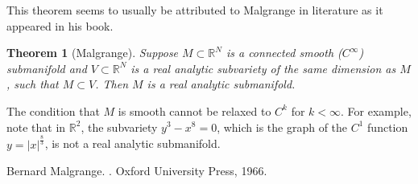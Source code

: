 \documentclass[12pt]{article}
\theoremstyle{theorem}
\newtheorem*{thm}{Theorem}
\theoremstyle{definition}
\theoremstyle{remark}
\begin{document}
This theorem seems to usually be attributed to Malgrange in literature as it appeared in his book\cite{Malgrange}.

\begin{thm}[Malgrange]
Suppose $M \subset {\mathbb{R}}^N$ is a connected smooth ($C^\infty$) submanifold and
$V \subset {\mathbb{R}}^N$ is a real analytic
subvariety of the same dimension as $M$, such that $M \subset V$.  Then $M$ is a real analytic submanifold.
\end{thm}

The condition that $M$ is smooth cannot be relaxed to $C^k$ for $k < \infty$.  For example, note
that in ${\mathbb{R}}^2$, the subvariety $y^3 - x^8 = 0$, which is the graph of the $C^1$ function $y = \lvert x \rvert^{\frac{8}{3}}$, is not a real analytic submanifold.

\begin{thebibliography}{9}
Bernard Malgrange.
{\em {}}.
Oxford University Press, 1966.
\end{thebibliography}
\end{document}
